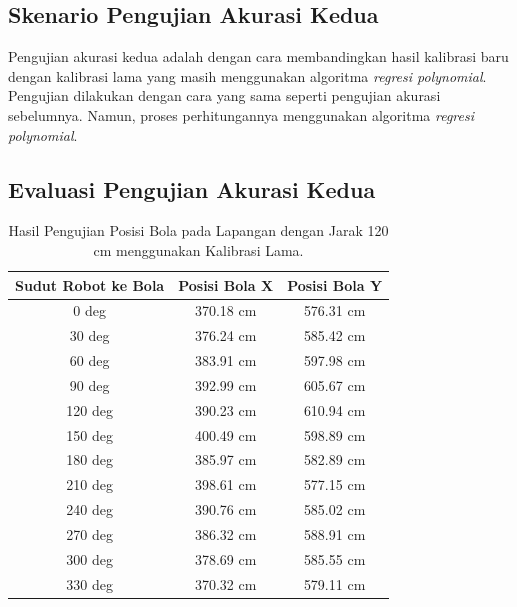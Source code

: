 \subsection{Skenario Pengujian Akurasi Kedua}
\label{sec:skenariopengujian2}

Pengujian akurasi kedua adalah dengan cara membandingkan hasil kalibrasi baru dengan kalibrasi lama yang masih menggunakan algoritma \emph{regresi polynomial}. Pengujian dilakukan dengan cara yang sama seperti pengujian akurasi sebelumnya. Namun, proses perhitungannya menggunakan algoritma \emph{regresi polynomial}. 

\subsection{Evaluasi Pengujian Akurasi Kedua}
\label{sec:analisispengujian2}
\begin{table}[htbp]

\caption{Hasil Pengujian Posisi Bola pada Lapangan dengan Jarak 120 cm menggunakan Kalibrasi Lama.}
\begin{center}
  

\begin{tabular}{|c|c|c|}
  \hline
  \rowcolor[HTML]{C0C0C0}
  \textbf{Sudut Robot ke Bola} & \textbf{Posisi Bola X} & \textbf{Posisi Bola Y} \\
  \hline
  0 deg            & 370.18 cm                & 576.31 cm            \\
  30 deg           & 376.24 cm                & 585.42 cm            \\
  60 deg           & 383.91 cm                & 597.98 cm            \\
  90 deg           & 392.99 cm                & 605.67 cm           \\
  120 deg           & 390.23 cm                & 610.94 cm           \\
  150 deg           & 400.49 cm                & 598.89 cm           \\
  180 deg           & 385.97 cm                & 582.89 cm           \\
  210 deg           & 398.61 cm                & 577.15 cm           \\
  240 deg           & 390.76 cm                & 585.02 cm           \\
  270 deg           & 386.32 cm                & 588.91 cm           \\
  300 deg           & 378.69 cm                & 585.55 cm           \\
  330 deg           & 370.32 cm                & 579.11 cm           \\
  \hline
\end{tabular}
\end{center}
\end{table}

